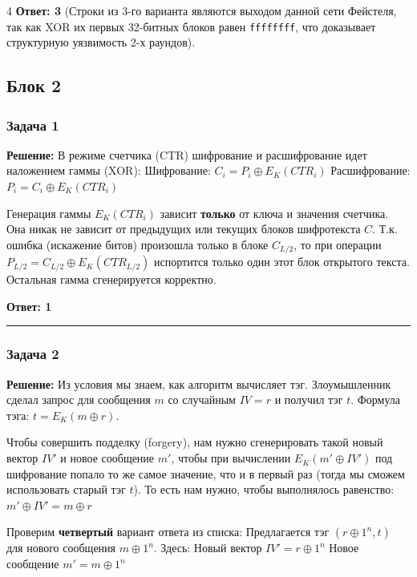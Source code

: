 ﻿\documentclass[8pt,a4paper,landscape]{extarticle}
\begin{document}
\begin{multicols*}{4}
\textbf{Ответ: 3} (Строки из 3-го варианта являются выходом данной сети Фейстеля, так как XOR их первых 32-битных блоков равен \texttt{ffffffff}, что доказывает структурную уязвимость 2-х раундов).

\subsection{Блок 2}\label{ux431ux43bux43eux43a-2}

\subsubsection{Задача 1}\label{ux437ux430ux434ux430ux447ux430-1}

\textbf{Решение:} В режиме счетчика (CTR) шифрование и расшифрование идет наложением гаммы (XOR): Шифрование: \(C_i = P_i \oplus E_K(CTR_i)\) Расшифрование: \(P_i = C_i \oplus E_K(CTR_i)\)

Генерация гаммы \(E_K(CTR_i)\) зависит \textbf{только} от ключа и значения счетчика. Она никак не зависит от предыдущих или текущих блоков шифротекста \(C\). Т.к. ошибка (искажение битов) произошла только в блоке \(C_{L/2}\), то при операции \(P_{L/2} = C_{L/2} \oplus E_K(CTR_{L/2})\) испортится только один этот блок открытого текста. Остальная гамма сгенерируется корректно.

\textbf{Ответ: 1}

\begin{center}\rule{0.5\linewidth}{0.5pt}\end{center}

\subsubsection{Задача 2}\label{ux437ux430ux434ux430ux447ux430-2}

\textbf{Решение:} Из условия мы знаем, как алгоритм вычисляет тэг. Злоумышленник сделал запрос для сообщения \(m\) со случайным \(IV = r\) и получил тэг \(t\). Формула тэга: \(t = E_K(m \oplus r)\).

Чтобы совершить подделку (forgery), нам нужно сгенерировать такой новый вектор \(IV'\) и новое сообщение \(m'\), чтобы при вычислении \(E_K(m' \oplus IV')\) под шифрование попало то же самое значение, что и в первый раз (тогда мы сможем использовать старый тэг \(t\)). То есть нам нужно, чтобы выполнялось равенство: \(m' \oplus IV' = m \oplus r\)

Проверим \textbf{четвертый} вариант ответа из списка: Предлагается тэг \textbf{\((r \oplus 1^n, t)\)} для нового сообщения \textbf{\(m \oplus 1^n\)}. Здесь: Новый вектор \(IV' = r \oplus 1^n\) Новое сообщение \(m' = m \oplus 1^n\)


\end{multicols*}
\end{document}
